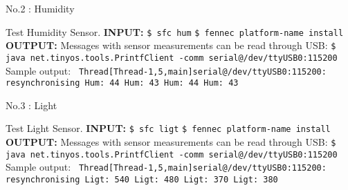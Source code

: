 \documentclass[11pt]{article}
\begin{document}
\begin{center}
{\large No.2 : Humidity}	
\end{center}
\vspace{1cm}
        Test Humidity Sensor. \newline
        \textbf{INPUT:}\newline
        \texttt{\$ sfc hum} \newline
        \texttt{\$ fennec \texttt{platform-name} install}\newline
        \textbf{OUTPUT:}\newline
        Messages with sensor measurements can be read through USB: \newline
        \texttt{\$ java net.tinyos.tools.PrintfClient -comm serial@/dev/ttyUSB0:115200} \newline
        Sample output:
        \texttt{\scriptsize
                Thread[Thread-1,5,main]serial@/dev/ttyUSB0:115200: resynchronising\newline
                Hum: 44\newline
                Hum: 43\newline
                Hum: 44\newline
                Hum: 43\newline
        }
\vspace{1cm}
\newpage

\begin{center}
{\large No.3 : Light}
\end{center}
\vspace{1cm}
        Test Light Sensor. \newline
        \textbf{INPUT:}\newline
        \texttt{\$ sfc ligt} \newline
        \texttt{\$ fennec \texttt{platform-name} install}\newline
        \textbf{OUTPUT:}\newline
        Messages with sensor measurements can be read through USB: \newline
        \texttt{\$ java net.tinyos.tools.PrintfClient -comm serial@/dev/ttyUSB0:115200} \newline
        Sample output:
        \texttt{\scriptsize
                Thread[Thread-1,5,main]serial@/dev/ttyUSB0:115200: resynchronising\newline
                Ligt: 540\newline
                Ligt: 480\newline
                Ligt: 370\newline
                Ligt: 380\newline
        }
\vspace{1cm}
\newpage
\end{document}
